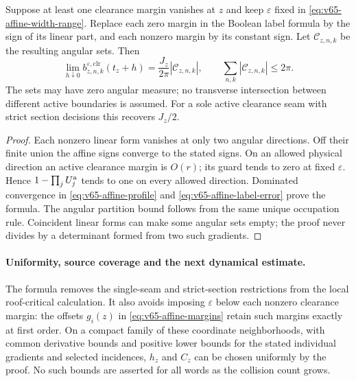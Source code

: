 \begin{corollary}
\label{cor:v65-multiple-seam-trace}
Suppose at least one clearance margin vanishes at $z$ and keep
$\varepsilon$ fixed in \eqref{eq:v65-affine-width-range}. Replace
each zero margin in the Boolean label formula by the sign of its
linear part, and each nonzero margin by its constant sign. Let
$\mathcal C_{z,n,k}$ be the resulting angular sets. Then
\begin{equation}\label{eq:v65-cone-trace}
 \lim_{h\downarrow0}b_{z,n,k}^{\varepsilon,\mathrm{clr}}(t_z+h)
     =\frac{J_z}{2\pi}|\mathcal C_{z,n,k}|,
       \qquad \sum_{n,k}|\mathcal C_{z,n,k}|\le2\pi.
\end{equation}
The sets may have zero angular measure; no transverse intersection
between different active boundaries is assumed. For a sole active
clearance seam with strict section decisions this recovers $J_z/2$.
\end{corollary}
\begin{proof}
Each nonzero linear form vanishes at only two angular directions.
Off their finite union the affine signs converge to the stated signs.
On an allowed physical direction an active clearance margin is
$O(r)$; its guard tends to zero at fixed $\varepsilon$. Hence
$1-\prod_jU_j^{\rm a}$ tends to one on every allowed direction.
Dominated convergence in \eqref{eq:v65-affine-profile} and
\eqref{eq:v65-affine-label-error} prove the formula. The angular
partition bound follows from the same unique occupation rule.
Coincident linear forms can make some angular sets empty; the proof
never divides by a determinant formed from two such gradients.
\end{proof}

\paragraph{Uniformity, source coverage and the next dynamical estimate.}
The formula removes the single-seam and strict-section restrictions
from the local roof-critical calculation. It also avoids imposing
$\varepsilon$ below each nonzero clearance margin: the offsets
$g_i(z)$ in \eqref{eq:v65-affine-margins} retain such margins exactly
at first order. On a compact family of these coordinate neighborhoods,
with common derivative bounds and positive lower bounds for the stated
individual gradients and selected incidences, $h_z$ and $C_z$ can be
chosen uniformly by the proof. No such bounds are asserted for all
words as the collision count grows.

